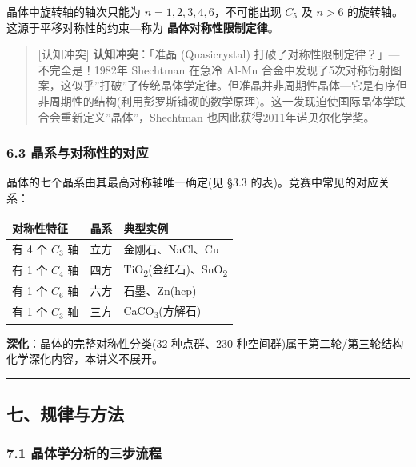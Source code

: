 晶体中旋转轴的轴次只能为 \(n = 1, 2, 3, 4, 6\)，不可能出现 \(C_5\) 及 \(n > 6\) 的旋转轴。这源于平移对称性的约束---称为 \textbf{晶体对称性限制定律}。

\begin{quote}
{[}认知冲突{]} \textbf{认知冲突}：「准晶 (Quasicrystal) 打破了对称性限制定律？」---不完全是！1982年 Shechtman 在急冷 Al-Mn 合金中发现了5次对称衍射图案，这似乎''打破''了传统晶体学定律。但准晶并非周期性晶体---它是有序但非周期性的结构(利用彭罗斯铺砌的数学原理)。这一发现迫使国际晶体学联合会重新定义''晶体''，Shechtman 也因此获得2011年诺贝尔化学奖。
\end{quote}

\subsubsection{6.3 晶系与对称性的对应}\label{ux6676ux7cfbux4e0eux5bf9ux79f0ux6027ux7684ux5bf9ux5e94}

晶体的七个晶系由其最高对称轴唯一确定(见 §3.3 的表)。竞赛中常见的对应关系：

{\def\LTcaptype{none} %
\begin{longtable}[]{@{}lcl@{}}
\toprule\noalign{}
对称性特征 & 晶系 & 典型实例 \\
\midrule\noalign{}
\endhead
\bottomrule\noalign{}
\endlastfoot
有 4 个 \(C_3\) 轴 & 立方 & 金刚石、NaCl、Cu \\
有 1 个 \(C_4\) 轴 & 四方 & TiO\textsubscript{2}(金红石)、SnO\textsubscript{2} \\
有 1 个 \(C_6\) 轴 & 六方 & 石墨、Zn(hcp) \\
有 1 个 \(C_3\) 轴 & 三方 & CaCO\textsubscript{3}(方解石) \\
\end{longtable}
}

\textbf{深化}：晶体的完整对称性分类(32 种点群、230 种空间群)属于第二轮/第三轮结构化学深化内容，本讲义不展开。

\begin{center}\rule{0.5\linewidth}{0.5pt}\end{center}

\subsection{七、规律与方法}\label{ux4e03ux89c4ux5f8bux4e0eux65b9ux6cd5}

\subsubsection{7.1 晶体学分析的三步流程}\label{ux6676ux4f53ux5b66ux5206ux6790ux7684ux4e09ux6b65ux6d41ux7a0b}

